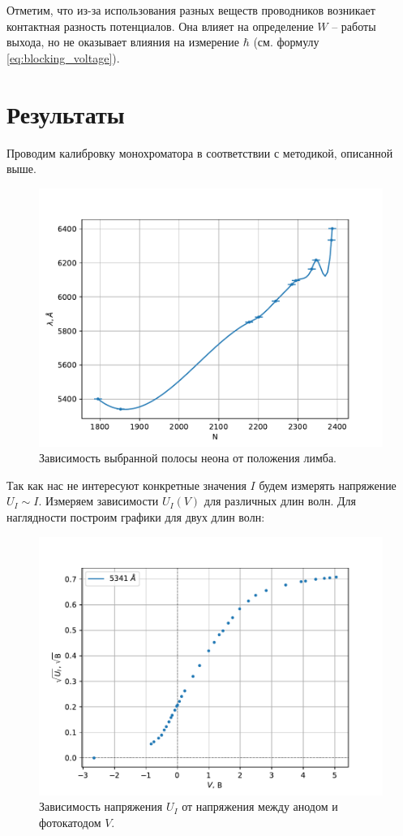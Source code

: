 \documentclass[a4paper, 12pt]{article} %
\begin{document}
	Отметим, что из-за использования разных веществ проводников возникает контактная разность потенциалов. Она влияет на определение $W$ -- работы выхода, но не оказывает влияния на измерение $\hbar$ (см. формулу \ref{eq:blocking_voltage}).
	
	\newpage
	\section{Результаты}
	
	Проводим калибровку монохроматора в соответствии с методикой, описанной выше.
	
	\begin{figure}[h!]
		\centering
		\begin{minipage}{0.65\textwidth}
			\centering
			\includegraphics[width=1.0\linewidth]{gen/calibration.pdf}
		\end{minipage}
		\caption{\centering
				 Зависимость выбранной полосы неона от положения лимба.}
		\label{fig:setup}
	\end{figure}
	
	Так как нас не интересуют конкретные значения $I$ будем измерять напряжение $U_I \sim I$.
	Измеряем зависимости $U_I(V)$ для различных длин волн. Для наглядности построим графики для двух длин волн:
	
	\begin{figure}[h!]
		\centering
		\includegraphics[width=0.7\linewidth]{gen/iv0.pdf}
		\caption{\centering
			Зависимость напряжения $U_I$ от напряжения между анодом и фотокатодом $V$.}
		\label{fig:iv_full}
	\end{figure}
	
\end{document}

